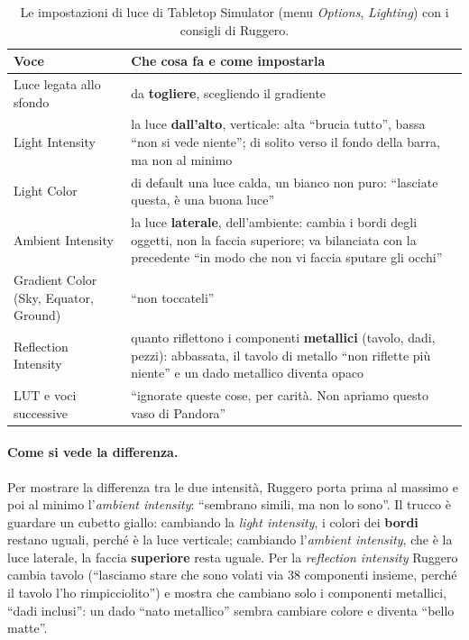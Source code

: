 \begin{table}[htbp]
\centering
\small
\begin{tabular}{@{}p{3.4cm}p{9.2cm}@{}}
\toprule
\textbf{Voce} & \textbf{Che cosa fa e come impostarla} \\
\midrule
Luce legata allo sfondo & da \textbf{togliere}, scegliendo il gradiente \\
Light Intensity & la luce \textbf{dall'alto}, verticale: alta ``brucia tutto'', bassa
``non si vede niente''; di solito verso il fondo della barra, ma non al minimo \\
Light Color & di default una luce calda, un bianco non puro: ``lasciate questa, è una
buona luce'' \\
Ambient Intensity & la luce \textbf{laterale}, dell'ambiente: cambia i bordi degli
oggetti, non la faccia superiore; va bilanciata con la precedente ``in modo che non vi
faccia sputare gli occhi'' \\
Gradient Color (Sky, Equator, Ground) & ``non toccateli'' \\
Reflection Intensity & quanto riflettono i componenti \textbf{metallici} (tavolo,
dadi, pezzi): abbassata, il tavolo di metallo ``non riflette più niente'' e un dado
metallico diventa opaco \\
LUT e voci successive & ``ignorate queste cose, per carità. Non apriamo questo vaso
di Pandora'' \\
\bottomrule
\end{tabular}
\caption{Le impostazioni di luce di Tabletop Simulator (menu \emph{Options},
\emph{Lighting}) con i consigli di Ruggero\protect\footnotemark.}
\label{a8:tab:luce}
\end{table}

\paragraph{Come si vede la differenza.} Per mostrare la differenza tra le due
intensità, Ruggero porta prima al massimo e poi al minimo l'\emph{ambient intensity}:
``sembrano simili, ma non lo sono''. Il trucco è guardare un cubetto giallo: cambiando
la \emph{light intensity}, i colori dei \textbf{bordi} restano uguali, perché è la luce
verticale; cambiando l'\emph{ambient intensity}, che è la luce laterale, la faccia
\textbf{superiore} resta uguale. Per la \emph{reflection intensity} Ruggero cambia
tavolo (``lasciamo stare che sono volati via 38 componenti insieme, perché il tavolo
l'ho rimpicciolito'') e mostra che cambiano solo i componenti metallici, ``dadi inclusi'':
un dado ``nato metallico'' sembra cambiare colore e diventa ``bello matte''.

